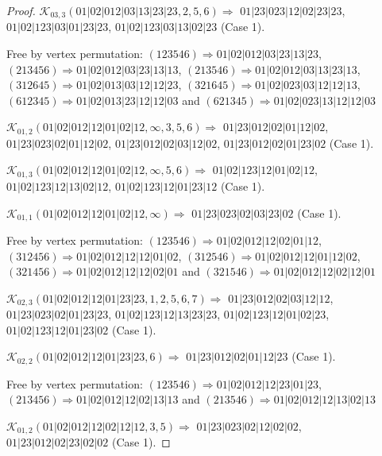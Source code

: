 \documentclass[12pt]{article}
\theoremstyle{plain}
\theoremstyle{definition}
\theoremstyle{remark}
\newcommand{\fancy}[1]{\mathcal{#1}}
\def\K{\fancy{K}}
\begin{document}
\begin{proof}
	$\K_{03,3}(01|02|012|03|13|23|23,2, 5, 6)\Rightarrow $ $01|23|023|12|02|23|23$, $01|02|123|03|01|23|23$, $01|02|123|03|13|02|23$ (Case 1).
	
	
	
	Free by vertex permutation: $(1 2 3 5 4 6)\Rightarrow 01|02|012|03|23|13|23$, $(2 1 3 4 5 6)\Rightarrow 01|02|012|03|23|13|13$, $(2 1 3 5 4 6)\Rightarrow 01|02|012|03|13|23|13$, $(3 1 2 6 4 5)\Rightarrow 01|02|013|03|12|12|23$, $(3 2 1 6 4 5)\Rightarrow 01|02|023|03|12|12|13$, $(6 1 2 3 4 5)\Rightarrow 01|02|013|23|12|12|03$ and $(6 2 1 3 4 5)\Rightarrow 01|02|023|13|12|12|03$
	
	
	
	\bigskip
	
	$\K_{01,2}(01|02|012|12|01|02|12,\infty,3, 5, 6)\Rightarrow $ $01|23|012|02|01|12|02$, $01|23|023|02|01|12|02$, $01|23|012|02|03|12|02$, $01|23|012|02|01|23|02$ (Case 1).
	
	$\K_{01,3}(01|02|012|12|01|02|12,\infty,5, 6)\Rightarrow $ $01|02|123|12|01|02|12$, $01|02|123|12|13|02|12$, $01|02|123|12|01|23|12$ (Case 1).
	
	$\K_{01,1}(01|02|012|12|01|02|12,\infty)\Rightarrow $ $01|23|023|02|03|23|02$ (Case 1).
	
	
	
	Free by vertex permutation: $(1 2 3 5 4 6)\Rightarrow 01|02|012|12|02|01|12$, $(3 1 2 4 5 6)\Rightarrow 01|02|012|12|12|01|02$, $(3 1 2 5 4 6)\Rightarrow 01|02|012|12|01|12|02$, $(3 2 1 4 5 6)\Rightarrow 01|02|012|12|12|02|01$ and $(3 2 1 5 4 6)\Rightarrow 01|02|012|12|02|12|01$
	
	
	
	\bigskip
	
	$\K_{02,3}(01|02|012|12|01|23|23,1, 2, 5, 6, 7)\Rightarrow $ $01|23|012|02|03|12|12$, $01|23|023|02|01|23|23$, $01|02|123|12|13|23|23$, $01|02|123|12|01|02|23$, $01|02|123|12|01|23|02$ (Case 1).
	
	$\K_{02,2}(01|02|012|12|01|23|23,6)\Rightarrow $ $01|23|012|02|01|12|23$ (Case 1).
	
	
	
	Free by vertex permutation: $(1 2 3 5 4 6)\Rightarrow 01|02|012|12|23|01|23$, $(2 1 3 4 5 6)\Rightarrow 01|02|012|12|02|13|13$ and $(2 1 3 5 4 6)\Rightarrow 01|02|012|12|13|02|13$
	
	
	
	\bigskip
	
	$\K_{01,2}(01|02|012|12|02|12|12,3, 5)\Rightarrow $ $01|23|023|02|12|02|02$, $01|23|012|02|23|02|02$ (Case 1).
	

\end{proof}
\end{document}
